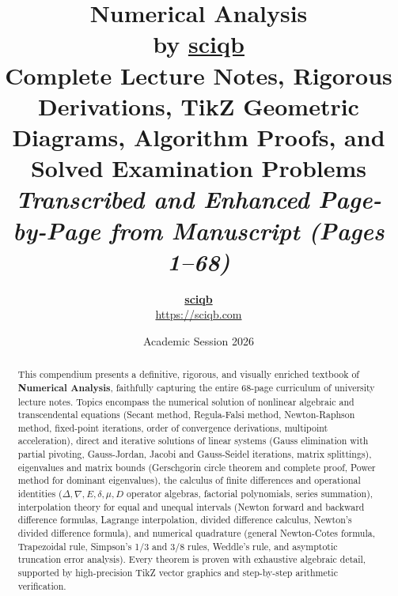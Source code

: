 \documentclass[11pt,a4paper,openany]{report}
\title{\Huge\textbf{\color{primary}Numerical Analysis}\\[0.35cm]
\LARGE\textbf{\color{secondary}by \href{https://sciqb.com}{\color{secondary}\underline{sciqb}}}\\[0.45cm]
\Large\textbf{\color{secondary!85}Complete Lecture Notes, Rigorous Derivations, TikZ Geometric Diagrams, Algorithm Proofs, and Solved Examination Problems}\\[0.2cm]
\normalsize\textit{Transcribed and Enhanced Page-by-Page from Manuscript (Pages 1--68)}}
\author{\textbf{\Large \href{https://sciqb.com}{sciqb}}\\[0.15cm]\small\href{https://sciqb.com}{\color{secondary}https://sciqb.com}}
\date{\large Academic Session 2026}
\begin{document}
\maketitle

\begin{abstract}
\noindent This compendium presents a definitive, rigorous, and visually enriched textbook of \textbf{Numerical Analysis}, faithfully capturing the entire 68-page curriculum of university lecture notes. Topics encompass the numerical solution of nonlinear algebraic and transcendental equations (Secant method, Regula-Falsi method, Newton-Raphson method, fixed-point iterations, order of convergence derivations, multipoint acceleration), direct and iterative solutions of linear systems (Gauss elimination with partial pivoting, Gauss-Jordan, Jacobi and Gauss-Seidel iterations, matrix splittings), eigenvalues and matrix bounds (Gerschgorin circle theorem and complete proof, Power method for dominant eigenvalues), the calculus of finite differences and operational identities ($\Delta, \nabla, E, \delta, \mu, D$ operator algebras, factorial polynomials, series summation), interpolation theory for equal and unequal intervals (Newton forward and backward difference formulas, Lagrange interpolation, divided difference calculus, Newton's divided difference formula), and numerical quadrature (general Newton-Cotes formula, Trapezoidal rule, Simpson's 1/3 and 3/8 rules, Weddle's rule, and asymptotic truncation error analysis). Every theorem is proven with exhaustive algebraic detail, supported by high-precision TikZ vector graphics and step-by-step arithmetic verification.
\end{abstract}

\vspace{1cm}
\tableofcontents
\newpage








\appendix

\end{document}
